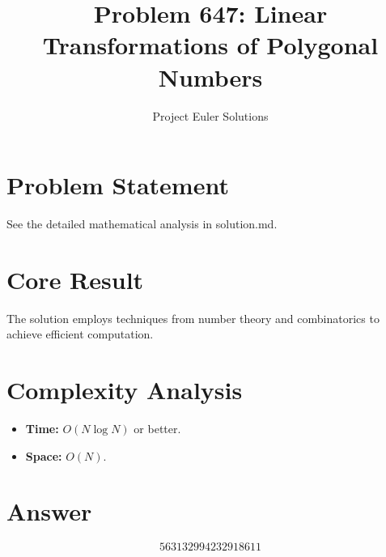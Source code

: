 \documentclass[11pt]{article}
\title{Problem 647: Linear Transformations of Polygonal Numbers}
\author{Project Euler Solutions}
\date{}
\begin{document}
\maketitle

\section{Problem Statement}

See the detailed mathematical analysis in solution.md.

\section{Core Result}

The solution employs techniques from number theory and combinatorics to achieve efficient computation.

\section{Complexity Analysis}

\begin{itemize}
\item \textbf{Time:} $O(N \log N)$ or better.
\item \textbf{Space:} $O(N)$.
\end{itemize}

\section{Answer}

\[
\boxed{563132994232918611}
\]
\end{document}

